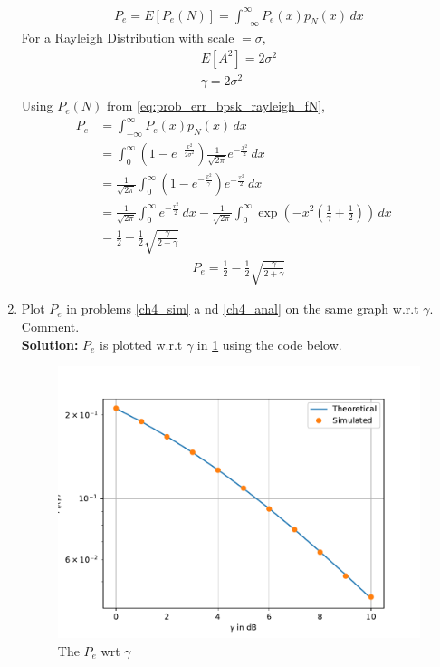 \documentclass[12pt]{book}
\providecommand{\sbrak}[1]{\ensuremath{{}\left[#1\right]}}
\newcommand{\solution}{\noindent \textbf{Solution: }}
\begin{document}
\begin{enumerate}
\begin{align}
 P_e=E\sbrak{P_e(N)} = \int_{-\infty}^{\infty}P_e(x)p_{N}(x)\, dx  
\end{align}
For a Rayleigh Distribution with scale $= \sigma$,
\begin{align}
E\sbrak{A^2} = 2\sigma^2\\
\gamma = 2\sigma^2\\
\end{align}
 Using $P_e(N)$ from \eqref{eq:prob_err_bpsk_rayleigh_fN},
    \begin{align*}
	P_e &= \int_{-\infty}^{\infty} P_e(x)p_N(x) \,dx&\\
		&= \int_{0}^{\infty} \left(1-e^{-\frac{x^2}{2\sigma^2}}\right)\frac{1}{\sqrt{2\pi}}e^{-\frac{x^2}{2}} \,dx\\
	&= \frac{1}{\sqrt{2\pi}}\int_{0}^{\infty} \left(1-e^{-\frac{x^2}{\gamma}}\right)e^{-\frac{x^2}{2}} \,dx\\
	&= \frac{1}{\sqrt{2\pi}}\int_{0}^{\infty} e^{-\frac{x^2}{2}}  \,dx  - \frac{1}{\sqrt{2\pi}}\int_{0}^{\infty} \exp\left(-x^2\left(\frac{1}{\gamma}+\frac{1}{2}\right)\right)  \,dx\\
	&= \frac{1}{2}-\frac{1}{2}\sqrt{\frac{\gamma}{2+\gamma}}
   \end{align*} 
\begin{align}
 P_e = \frac{1}{2} - \frac{1}{2}\sqrt{\frac{\gamma}{2+\gamma}}
\end{align}
\item
Plot $P_e$ in problems \ref{ch4_sim} a nd \ref{ch4_anal} on the same graph w.r.t $\gamma$.  Comment. \\
\solution $P_e$ is plotted w.r.t $\gamma$ in \ref{fig:Pe_gamma1} using the code below.
\begin{center}
\end{center}
\begin{figure}[H]
\centering
\includegraphics[width=\columnwidth]{./figs/4/4.2.4.pdf}
\caption{The $P_e$ wrt $\gamma$ }
\label{fig:Pe_gamma1}
\end{figure}
\end{enumerate}
\end{document}
